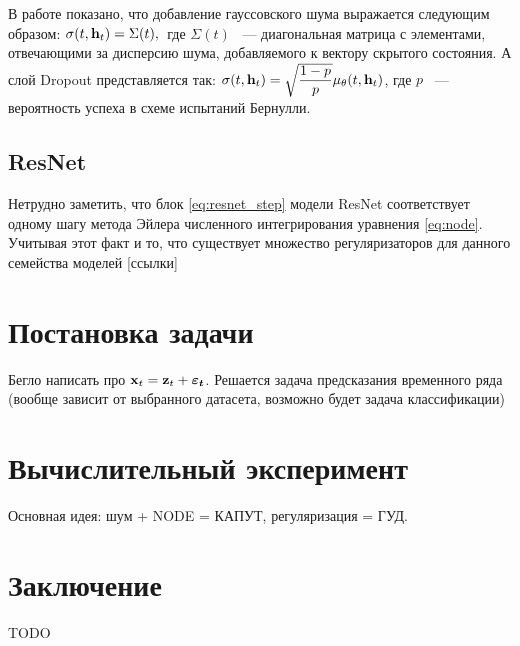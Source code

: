 \documentclass[a4paper, 14pt]{article}
\begin{document}
	В работе \cite{Liu2019} показано, что добавление гауссовского шума выражается следующим образом: $\sigma(t, \mathbf{h}_t) = \Sigma(t), \:$ где $\Sigma(t)$ ~--- диагональная матрица с элементами, отвечающими за дисперсию шума, добавляемого к вектору скрытого состояния.
	А слой Dropout представляется так: $\sigma(t, \mathbf{h}_t) = \sqrt{\dfrac{1 - p}{p}} \mu_\theta(t, \mathbf{h}_t)$, где $p$ ~--- вероятность успеха в схеме испытаний Бернулли. 
	
	\subsection{ResNet}
	Нетрудно заметить, что блок \ref{eq:resnet_step} модели ResNet соответствует одному шагу метода Эйлера численного интегрирования уравнения \ref{eq:node}.
	Учитывая этот факт и то, что существует множество регуляризаторов для данного семейства моделей [ссылки]
	
	\section{Постановка задачи}
	Бегло написать про $\mathbf{x}_t = \mathbf{z}_t + \boldsymbol{\varepsilon_t}$. 
	Решается задача предсказания временного ряда (вообще зависит от выбранного датасета, возможно будет задача классификации)
	
	\section{Вычислительный эксперимент}
	Основная идея: шум + NODE = КАПУТ, регуляризация = ГУД.
	
	\section{Заключение}
	TODO
	
	
	
	
\end{document}
